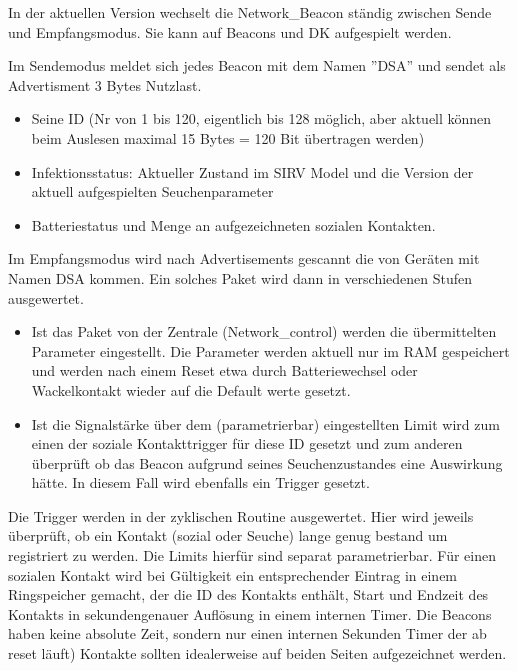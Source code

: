 \documentclass[11pt,ngerman]{scrartcl} %
\begin{document}
In der aktuellen Version wechselt die Network\_Beacon ständig zwischen Sende und Empfangsmodus. Sie kann auf Beacons und DK aufgespielt werden.

Im Sendemodus  meldet sich jedes Beacon mit dem Namen ''DSA'' und sendet als Advertisment 3 Bytes Nutzlast. 
\begin{itemize}
\item Seine ID (Nr von 1 bis 120, eigentlich bis 128 möglich, aber aktuell können beim Auslesen maximal 15 Bytes = 120 Bit übertragen werden)
\item Infektionsstatus: Aktueller Zustand im SIRV Model und die Version der aktuell aufgespielten Seuchenparameter
\item Batteriestatus und Menge an aufgezeichneten sozialen Kontakten.
\end{itemize}

Im Empfangsmodus wird nach Advertisements gescannt die von Geräten mit Namen DSA kommen. Ein solches Paket wird dann in verschiedenen Stufen ausgewertet.
\begin{itemize}
\item Ist das Paket von der Zentrale (Network\_control) werden die übermittelten Parameter eingestellt. Die Parameter werden aktuell nur im RAM gespeichert und werden nach einem Reset etwa durch Batteriewechsel oder Wackelkontakt wieder auf die Default werte gesetzt. 
\item Ist die Signalstärke über dem (parametrierbar) eingestellten Limit wird zum einen der soziale Kontakttrigger für diese ID gesetzt und zum anderen überprüft ob das Beacon aufgrund seines Seuchenzustandes eine Auswirkung hätte. In diesem Fall wird ebenfalls ein Trigger gesetzt.
\end{itemize}
Die Trigger werden in der zyklischen Routine ausgewertet. Hier wird jeweils überprüft, ob ein Kontakt (sozial oder Seuche) lange genug bestand um registriert zu werden. Die Limits hierfür sind separat parametrierbar. Für einen sozialen Kontakt wird bei Gültigkeit ein entsprechender Eintrag in einem Ringspeicher gemacht, der die ID des Kontakts enthält, Start und Endzeit des Kontakts in sekundengenauer Auflösung in einem internen Timer. Die Beacons haben keine absolute Zeit, sondern nur einen internen Sekunden Timer der ab reset läuft) Kontakte sollten idealerweise auf beiden Seiten aufgezeichnet werden.
\end{document}
